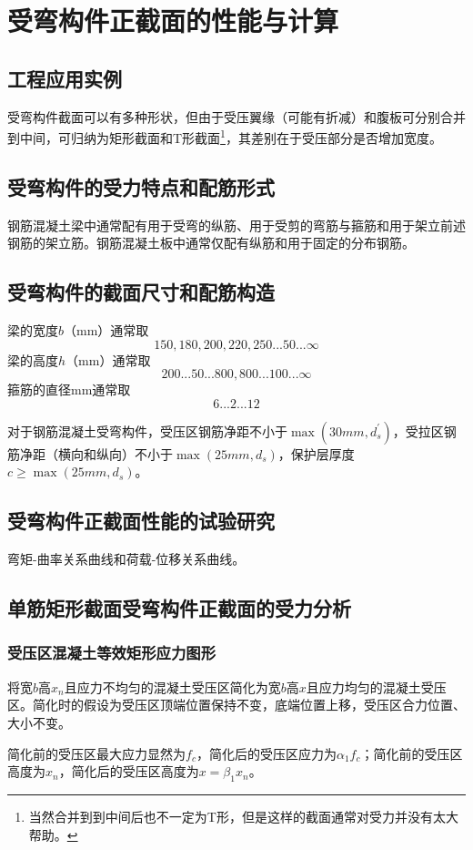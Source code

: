 \documentclass{article}
\begin{document}
\section{受弯构件正截面的性能与计算}
\subsection{工程应用实例}
\par 受弯构件截面可以有多种形状，但由于受压翼缘（可能有折减）和腹板可分别合并到中间，可归纳为矩形截面和T形截面\footnote{当然合并到到中间后也不一定为T形，但是这样的截面通常对受力并没有太大帮助。}，其差别在于受压部分是否增加宽度。
\subsection{受弯构件的受力特点和配筋形式}
\par 钢筋混凝土梁中通常配有用于受弯的纵筋、用于受剪的弯筋与箍筋和用于架立前述钢筋的架立筋。钢筋混凝土板中通常仅配有纵筋和用于固定的分布钢筋。
\subsection{受弯构件的截面尺寸和配筋构造}
\par 梁的宽度$b$（\unit{\mm}）通常取
$$
      150, 180, 200, 220, 250...50...\infty
$$
梁的高度$h$（\unit{\mm}）通常取
$$
      200...50...800,800...100...\infty
$$
箍筋的直径\unit{\mm}通常取
$$
      6...2...12
$$
\par 对于钢筋混凝土受弯构件，受压区钢筋净距不小于$\max(30mm, d_s^{\prime})$，受拉区钢筋净距（横向和纵向）不小于$\max(25mm, d_s)$，保护层厚度$c \ge \max(25mm, d_s)$。
\subsection{受弯构件正截面性能的试验研究}
\par 弯矩-曲率关系曲线和荷载-位移关系曲线。
\subsection{单筋矩形截面受弯构件正截面的受力分析}
\subsubsection{受压区混凝土等效矩形应力图形}
\par 将宽$b$高$x_n$且应力不均匀的混凝土受压区简化为宽$b$高$x$且应力均匀的混凝土受压区。简化时的假设为受压区顶端位置保持不变，底端位置上移，受压区合力位置、大小不变。
\par 简化前的受压区最大应力显然为$f_c$，简化后的受压区应力为$\alpha_1f_c$；简化前的受压区高度为$x_n$，简化后的受压区高度为$x=\beta_1x_n$。
\end{document}
